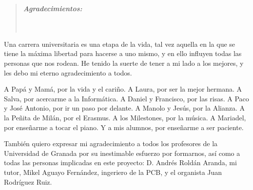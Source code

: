 \cleardoublepage
{}
{}

\vspace*{2.5cm}


\begin{quotation}
\noindent \begin{center}
\textbf{\emph{\Large Agradecimientos:}}\textbf{\emph{\large }}\\
\textbf{\emph{\large }}\\
\textbf{\emph{\large }}\\
\textbf{\emph{\large }}
\par\end{center}{\large \par}
\end{quotation}

\begin{onehalfspace}

Una carrera universitaria es una etapa de la vida, tal vez aquella en la que se tiene la máxima libertad para hacerse a uno mismo, y en ello influyen todas las personas que nos rodean. He tenido la suerte de tener a mi lado a los mejores, y les debo mi eterno agradecimiento a todos.

A Papá y Mamá, por la vida y el cariño. A Laura, por ser la mejor hermana. A Salva, por acercarme a la Informática. A Daniel y Francisco, por las risas. A Paco y José Antonio, por ir un paso por delante. A Manolo y Jesús, por la Alianza. A la Peñita de Milán, por el Erasmus. A los Milestones, por la música. A Mariadel, por enseñarme a tocar el piano. Y a mis alumnos, por enseñarme a ser paciente.

También quiero expresar mi agradecimiento a todos los profesores de la Universidad de Granada por su inestimable esfuerzo por formarnos, así como a todas las personas implicadas en este proyecto: D. Andrés Roldán Aranda, mi tutor, Mikel Aguayo Fernández, ingeriero de la PCB, y el organista Juan Rodríguez Ruiz.

\end{onehalfspace}


\clearpage{\pagestyle{empty}\cleardoublepage}%
